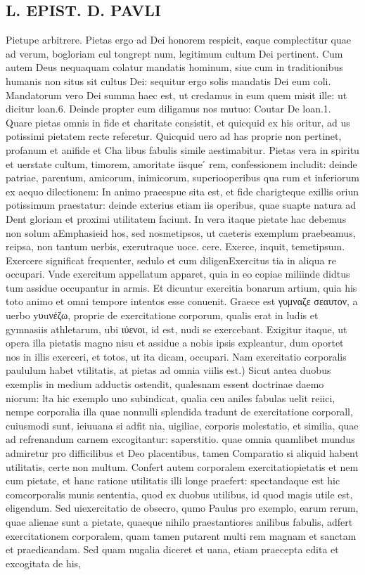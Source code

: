 \documentclass{article}
\begin{document}
\begin{pages}
\section*{L. EPIST. D. PAVLI }
\marginpar{[ p.96 ]}\pstart Pietupe arbitrere. Pietas ergo ad Dei honorem respicit, eaque complectitur quae ad verum, bogloriam cul tongrept num, legitimum cultum Dei pertinent. Cum autem Deus nequaquam colatur mandatis hominum, siue cum in traditionibus humanis non situs sit cultus Dei: sequitur ergo solis mandatis Dei eum coli. Mandatorum vero Dei summa haec est, ut credamus in eum quem misit ille: ut dicitur loan.6. Deinde propter eum diligamus nos mutuo: Coutar De loan.1. Quare pietas omnis in fide et charitate consistit, et quicquid ex his oritur, ad us potissimi pietatem recte referetur. Quicquid uero ad has proprie non pertinet, profanum et anifide et Cha libus fabulis simile aestimabitur. Pietas vera in spiritu et uerstate cultum, timorem, amoritate iisque ́ rem, confessionem includit: deinde patriae, parentum, amicorum, inimicorum, superiooperibus qua rum et inferiorum ex aequo dilectionem: In animo praecspue sita est, et fide charigteque  exillis oriun potissimum praestatur: deinde exterius etiam iis operibus, quae suapte natura ad Dent gloriam et proximi utilitatem faciunt. In vera itaque pietate hac debemus non solum aEmphasieid hos, sed nosmetipsos, ut caeteris exemplum praebeamus, reipsa, non tantum uerbis, exerutraque uoce. cere. Exerce, inquit, temetipsum. Exercere significat frequenter, sedulo et cum diligenExercitus tia in aliqua re occupari. Vnde exercitum appellatum apparet, quia in eo copiae miliinde didtus tum assidue occupantur in armis. Et dicuntur exercitia bonarum artium, quia his toto animo et omni tempore intentos esse conuenit. Graece est γυμναζε σεαυτον, a uerbo yυuνέζω, proprie de exercitatione corporum, qualis erat in ludis et gymnasiis athletarum, ubi ιύενοι, id est, nudi se exercebant. Exigitur itaque, ut opera illa pietatis magno nisu et assidue a nobis ipsis expleantur, dum oportet nos in illis exerceri, et totos, ut ita dicam, occupari.  \pend\pstart Nam exercitatio corporalis paululum habet vtilitatis, at pietas ad omnia viilis est.) Sicut antea duobus exemplis in medium adductis ostendit, qualesnam essent doctrinae daemo niorum: lta hic exemplo uno subindicat, qualia ceu aniles fabulas uelit reiici, nempe corporalia illa quae nonnulli splendida tradunt de exercitatione corporall, cuiusmodi sunt, ieiuuana si adfit nia, uigiliae, corporis molestatio, et similia, quae ad refrenandum carnem excogitantur: saperstitio. quae omnia quamlibet mundus admiretur pro difficilibus et Deo placentibus, tamen Comparatio si aliquid habent utilitatis, certe non multum. Confert autem corporalem exercitatiopietatis et nem cum pietate, et hanc ratione utilitatis illi longe praefert: spectandaque est hic comcorporalis munis sententia, quod ex duobus utilibus, id quod magis utile est, eligendum. Sed uiexercitatio de obsecro, qumo Paulus pro exemplo, earum rerum, quae alienae sunt a pietate, quaeque  nihilo praestantiores anilibus fabulis, adfert exercitationem corporalem, quam tamen putarent multi rem magnam et sanctam et praedicandam. Sed quam nugalia diceret et uana, etiam praecepta edita et excogitata de his, 
\end{pages}
\end{document}
